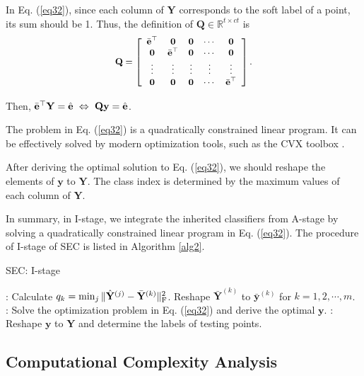 \documentclass[10pt,journal,compsoc]{IEEEtran}
\begin{document}
In Eq. (\ref{eq32}), since each column of $\mathbf{Y}$ corresponds to the soft label of a point, its sum should be 1. Thus, the definition of $\mathbf{Q} \in \mathbb{R}^{t\times ct}$ is
\begin{equation*}
\small{
\begin{split}
\mathbf{Q} = \left[ {\begin{array}{*{20}{c}}
\bar{\mathbf{e}}^\top &\mathbf{0}&\mathbf{0}& \cdots &\mathbf{0}\\
\mathbf{0}&\bar{\mathbf{e}}^\top&\mathbf{0}& \cdots &\mathbf{0}\\
 \vdots & \vdots & \vdots & \vdots & \vdots \\
\mathbf{0}&\mathbf{0}&\mathbf{0}& \cdots &\bar{\mathbf{e}}^\top
\end{array}} \right].
\end{split}}
\end{equation*}

Then, $\small{\bar{\mathbf{e}}^\top \mathbf{Y} = \hat{\mathbf{e}}~\Leftrightarrow~ \mathbf{Q} \mathbf{y} = \hat{\mathbf{e}}}$.

The problem in Eq. (\ref{eq32}) is a quadratically constrained linear program. It can be effectively solved by modern optimization tools, such as the CVX toolbox \cite{cvx, gb08}.

After deriving the optimal solution to Eq. (\ref{eq32}), we should reshape the elements of $\mathbf{y}$ to $\mathbf{Y}$. The class index is determined by the maximum values of each column of $\mathbf{Y}$.

In summary, in I-stage, we integrate the inherited classifiers from A-stage by solving a quadratically constrained linear program in Eq. (\ref{eq32}). The
procedure of I-stage of SEC is listed in Algorithm \ref{alg2}.

\begin{algorithm}[!t]
\caption{SEC: I-stage}
\label{alg2}
\small{
\begin{algorithmic}
: Calculate $q_k=\min_j \|\hat{\mathbf{Y}}^{(j)}- \bar{\mathbf{Y}}^{(k)}\|_{\rm{F}}^2$. Reshape $\bar{\mathbf{Y}}^{(k)}$ to $\bar{\mathbf{y}}^{(k)}$ for $k=1,2,\cdots, m$.  \\
: Solve the optimization problem in Eq. (\ref{eq32}) and derive the optimal $\mathbf{y}$.
: Reshape $\mathbf{y}$ to $\mathbf{Y}$ and determine the labels of testing points.
\end{algorithmic}}
\end{algorithm}

\subsection{Computational Complexity Analysis}
\end{document}
